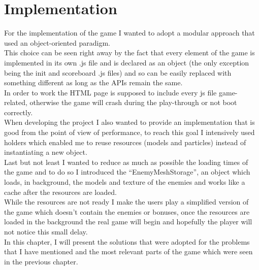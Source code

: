 \documentclass[a4paper,11pt]{article}
\begin{document}
\section{Implementation}
For the implementation of the game I wanted to adopt a modular approach that used an object-oriented paradigm.\\
This choice can be seen right away by the fact that every element of the game is implemented in its own .js file and is declared as an object (the only exception being the init and scoreboard .js files) and so can be easily replaced with something different as long as the APIs remain the same.\\
In order to work the HTML page is supposed to include every js file game-related, otherwise the game will crash during the play-through or not boot correctly.\\
When developing the project I also wanted to provide an implementation that is good from the point of view of performance, to reach this goal I intensively used holders which enabled me to reuse resources (models and particles) instead of instantiating a new object.\\
Last but not least I wanted to reduce as much as possible the loading times of the game and to do so I introduced the ``EnemyMeshStorage'', an object which loads, in background, the models and texture of the enemies and works like a cache after the resources are loaded.\\
While the resources are not ready I make the users play a simplified version of the game which doesn't contain the enemies or bonuses, once the resources are loaded in the background the real game will begin and hopefully the player will not notice this small delay.\\
In this chapter, I will present the solutions that were adopted for the problems that I have mentioned and the most relevant parts of the game which were seen in the previous chapter.
\end{document}
